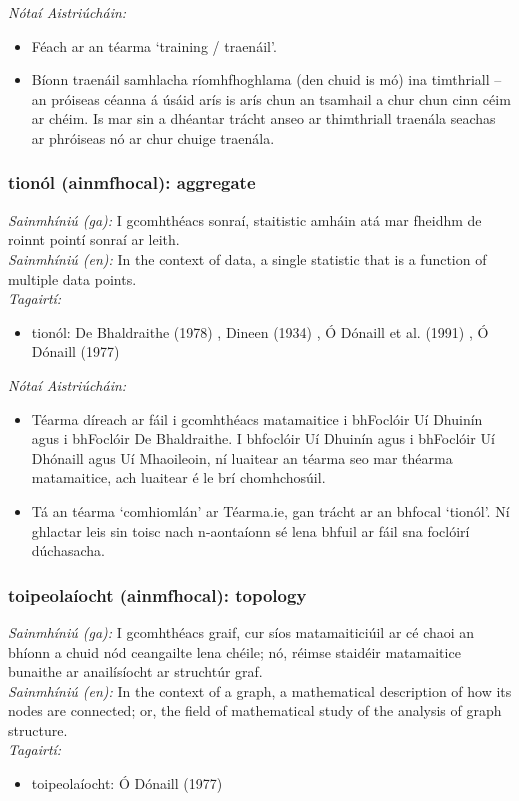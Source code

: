  \noindent \textit{Nótaí Aistriúcháin:}
\begin{itemize}
	\item Féach ar an téarma `training / traenáil'.
	\item Bíonn traenáil samhlacha ríomhfhoghlama (den chuid is mó) ina timthriall -- an próiseas céanna á úsáid arís is arís chun an tsamhail a chur chun cinn céim ar chéim. Is mar sin a dhéantar trácht anseo ar thimthriall traenála seachas ar phróiseas nó ar chur chuige traenála.
\end{itemize}


\subsubsection*{tionól (ainmfhocal): aggregate}
 \noindent \textit{Sainmhíniú (ga):} I gcomhthéacs sonraí, staitistic amháin atá mar fheidhm de roinnt pointí sonraí ar leith.
\\
 \noindent \textit{Sainmhíniú (en):} In the context of data, a single statistic that is a function of multiple data points.
\\
 \noindent \textit{Tagairtí:}
\begin{itemize}
	\item tionól: De Bhaldraithe (1978) \cite{de-bhaldraithe}, Dineen (1934) \cite{dineen}, Ó Dónaill et al. (1991) \cite{focloir-beag}, Ó Dónaill (1977) \cite{odonaill}
\end{itemize}

 \noindent \textit{Nótaí Aistriúcháin:}
\begin{itemize}
	\item Téarma díreach ar fáil i gcomhthéacs matamaitice i bhFoclóir Uí Dhuinín agus i bhFoclóir De Bhaldraithe. I bhfoclóir Uí Dhuinín agus i bhFoclóir Uí Dhónaill agus Uí Mhaoileoin, ní luaitear an téarma seo mar théarma matamaitice, ach luaitear é le brí chomhchosúil.
	\item Tá an téarma `comhiomlán' ar Téarma.ie, gan trácht ar an bhfocal `tionól'. Ní ghlactar leis sin toisc nach n-aontaíonn sé lena bhfuil ar fáil sna foclóirí dúchasacha. 
\end{itemize}


\subsubsection*{toipeolaíocht (ainmfhocal): topology}
 \noindent \textit{Sainmhíniú (ga):} I gcomhthéacs graif, cur síos matamaiticiúil ar cé chaoi an bhíonn a chuid nód ceangailte lena chéile; nó, réimse staidéir matamaitice bunaithe ar anailísíocht ar struchtúr graf.
\\
 \noindent \textit{Sainmhíniú (en):} In the context of a graph, a mathematical description of how its nodes are connected; or, the field of mathematical study of the analysis of graph structure.
\\
 \noindent \textit{Tagairtí:}
\begin{itemize}
	\item toipeolaíocht: Ó Dónaill (1977) \cite{odonaill}
\end{itemize}

